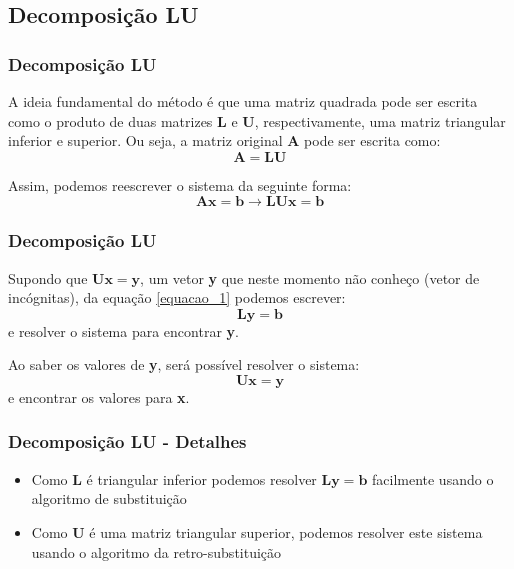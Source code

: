 \documentclass{beamer}
\theoremstyle{mystyle}
\begin{document}
\subsection{Decomposição LU}

\begin{frame}
	\frametitle{Decomposição LU}
	A ideia fundamental do método é que uma matriz quadrada pode ser escrita como o produto de duas matrizes \textbf{L} e \textbf{U}, respectivamente, uma matriz triangular inferior e superior. Ou seja, a matriz original \textbf{A} pode ser escrita como:
	\begin{equation*}
		\mathbf{A} = \mathbf{LU}
	\end{equation*}
	
	Assim, podemos reescrever o sistema da seguinte forma:
	\begin{equation}\label{equacao_1}
		\mathbf{Ax} = \mathbf{b} \rightarrow \mathbf{LUx} = \mathbf{b}
	\end{equation}
\end{frame}

\begin{frame}
	\frametitle{Decomposição LU}
	Supondo que $ \mathbf{Ux} = \mathbf{y} $, um vetor \textbf{y} que neste momento não conheço (vetor de incógnitas), da equação \ref{equacao_1} podemos escrever:
	\begin{equation*}
		\mathbf{Ly} = \mathbf{b}
	\end{equation*}
	e resolver o sistema para encontrar \textbf{y}. 
	
	Ao saber os valores de \textbf{y}, será possível resolver o sistema:
	\begin{equation*}
		\mathbf{Ux} = \mathbf{y}
	\end{equation*}
	e encontrar os valores para \textbf{x}.
\end{frame}

\begin{frame}
	\frametitle{Decomposição LU - Detalhes}
	\begin{itemize}
		\item Como \textbf{L} é triangular inferior podemos resolver $ \mathbf{Ly} = \mathbf{b} $ facilmente usando o algoritmo de substituição
		\item  Como \textbf{U} é uma matriz triangular superior, podemos resolver este sistema usando o algoritmo da retro-substituição
	\end{itemize}
\end{frame}
\end{document}
